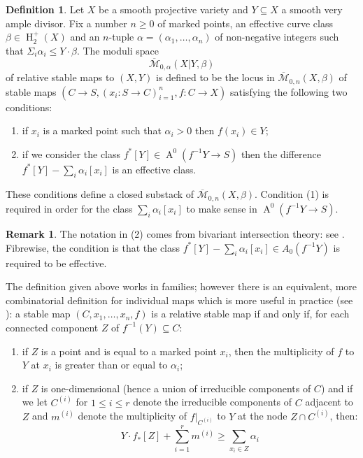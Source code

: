 \documentclass[11pt]{amsart}
\newcommand{\M}[4]{\overline{\mathcal{M}}_{#1,#2}(#3,#4)}
\renewcommand{\to}{\rightarrow}
\newcommand{\HH}{\operatorname{H}}
\newcommand{\Achow}{\operatorname{A}}
\theoremstyle{definition}
\theoremstyle{definition}
\newtheorem{definition}[thm]{Definition}
\newtheorem{remark}[thm]{Remark}
\begin{document}
\begin{definition} {\cite[Definition 1.1]{Ga}}  Let $X$ be a smooth projective variety and $Y \subseteq X$ a smooth very ample divisor. Fix a number $n \geq 0$ of marked points, an effective curve class $\beta \in \HH_2^+(X)$ and an $n$-tuple $\alpha = (\alpha_1, \ldots, \alpha_n)$ of non-negative integers such that $\Sigma_i \alpha_i \leq Y \cdot \beta$. The moduli space
\begin{equation*} \M{0}{\alpha}{X|Y}{\beta} \end{equation*}
of relative stable maps to $(X,Y)$ is defined to be the locus in $\M{0}{n}{X}{\beta}$ of stable maps $(C \to S , (x_i : S \to C)_{i=1}^n , f : C \to X)$ satisfying the following two conditions:
\begin{enumerate}
\item if $x_i$ is a marked point such that $\alpha_i > 0$ then $f(x_i) \in Y$;
\item if we consider the class $f^* [Y] \in \Achow^0(f^{-1}Y \to S)$ then the difference $f^* [Y] - \sum_i \alpha_i [x_i]$ is an effective class.
\end{enumerate}
These conditions define a closed substack of $\M{0}{n}{X}{\beta}$. Condition (1) is required in order for the class $\sum_i \alpha_i [x_i]$ to make sense in $\Achow^0(f^{-1}Y \to S)$.
\end{definition}

\begin{remark} The notation in (2) comes from bivariant intersection theory: see \cite[\S 17]{FUL}. Fibrewise, the condition is that the class $f^*[Y] - \sum_i \alpha_i [x_i] \in A_0(f^{-1}Y)$ is required to be effective.\end{remark}

The definition given above works in families; however there is an equivalent, more combinatorial definition for individual maps which is more useful in practice (see \cite[Remark 1.4]{Ga}): a stable map $(C,x_1, \ldots, x_n,f)$ is a relative stable map if and only if, for each connected component $Z$ of $f^{-1}(Y) \subseteq C$:
\begin{enumerate}
\item if $Z$ is a point and is equal to a marked point $x_i$, then the multiplicity of $f$ to $Y$ at $x_i$ is greater than or equal to $\alpha_i$;
\item if $Z$ is one-dimensional (hence a union of irreducible components of $C$) and if we let $C^{(i)}$ for $1 \leq i \leq r$ denote the irreducible components of $C$ adjacent to $Z$ and $m^{(i)}$ denote the multiplicity of $f|_{C^{(i)}}$ to $Y$ at the node $Z \cap C^{(i)}$, then:
\begin{equation} \label{Relative stable map internal component inequality} Y \cdot f_* [Z] + \sum_{i=1}^r m^{(i)} \geq \sum_{x_i \in Z} \alpha_i \tag{\textasteriskcentered} \end{equation}
\end{enumerate}
\end{document}
